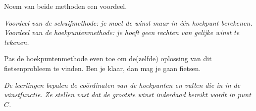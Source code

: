 	\begin{werktekstoef}
	
	\setcounter{enumi}{12}
	    
	\item Noem van beide methoden een voordeel.
	
	\emph{Voordeel van de schuifmethode: je moet de winst maar in één hoekpunt berekenen. Voordeel van de hoekpuntenmethode: je hoeft geen rechten van gelijke winst te tekenen.}
	
	\item Pas de hoekpuntenmethode even toe om de(zelfde) oplossing van dit fietsenprobleem te vinden. Ben je klaar, dan mag je gaan fietsen.
	
	\emph{De leerlingen bepalen de coördinaten van de hoekpunten en vullen die in in de winstfunctie. Ze stellen vast dat de grootste winst inderdaad bereikt wordt in punt $C$.}

    \end{werktekstoef}
    
\eindewerktekst
    
